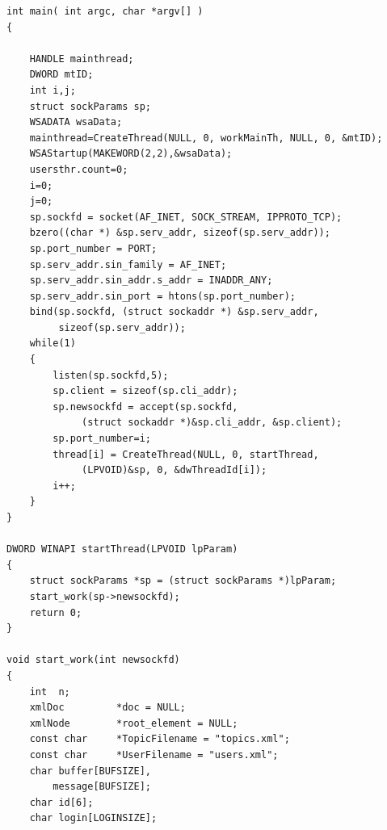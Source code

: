\documentclass[10pt,a4paper]{report}
\begin{document}
\begin{verbatim}
int main( int argc, char *argv[] )
{

	HANDLE mainthread;
	DWORD mtID;
	int i,j;
	struct sockParams sp;
	WSADATA wsaData;
	mainthread=CreateThread(NULL, 0, workMainTh, NULL, 0, &mtID);
	WSAStartup(MAKEWORD(2,2),&wsaData);
	usersthr.count=0;
	i=0;
	j=0;
    sp.sockfd = socket(AF_INET, SOCK_STREAM, IPPROTO_TCP);
    bzero((char *) &sp.serv_addr, sizeof(sp.serv_addr));
    sp.port_number = PORT;
    sp.serv_addr.sin_family = AF_INET;
    sp.serv_addr.sin_addr.s_addr = INADDR_ANY;
    sp.serv_addr.sin_port = htons(sp.port_number);
	bind(sp.sockfd, (struct sockaddr *) &sp.serv_addr,
		 sizeof(sp.serv_addr));
    while(1)
    {
    	listen(sp.sockfd,5);
    	sp.client = sizeof(sp.cli_addr);
		sp.newsockfd = accept(sp.sockfd,
			 (struct sockaddr *)&sp.cli_addr, &sp.client);
		sp.port_number=i;
		thread[i] = CreateThread(NULL, 0, startThread,
			 (LPVOID)&sp, 0, &dwThreadId[i]);
		i++;
	}
}

DWORD WINAPI startThread(LPVOID lpParam)
{
	struct sockParams *sp = (struct sockParams *)lpParam;
	start_work(sp->newsockfd);
	return 0;
}

void start_work(int newsockfd)
{
	int  n;
	xmlDoc         *doc = NULL;
	xmlNode        *root_element = NULL;
	const char     *TopicFilename = "topics.xml";
	const char     *UserFilename = "users.xml";
	char buffer[BUFSIZE],
		message[BUFSIZE];
	char id[6];
	char login[LOGINSIZE];


\end{verbatim}
\end{document}
